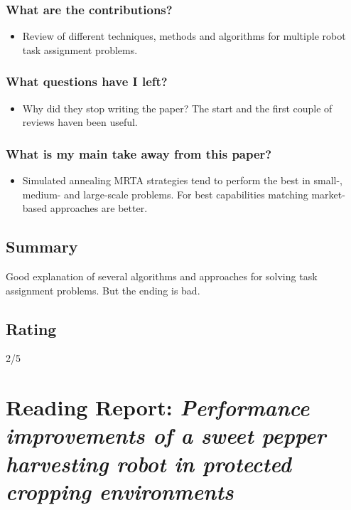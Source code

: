 \subsubsection*{What are the contributions?}
\begin{itemize}
    \item Review of different techniques, methods and algorithms for multiple robot task assignment problems.
\end{itemize}
\subsubsection*{What questions have I left?}
\begin{itemize}
    \item Why did they stop writing the paper? The start and the first couple of reviews haven been useful.
\end{itemize}
\subsubsection*{What is my main take away from this paper?}
\begin{itemize}
    \item Simulated annealing MRTA strategies tend to perform the best in small-, medium- and large-scale problems. For best capabilities matching market-based approaches are better.
\end{itemize}

\subsection*{Summary}
Good explanation of several algorithms and approaches for solving task assignment problems. But the ending is bad.
\subsection*{Rating}
2/5



\section{Reading Report: \emph{Performance improvements of a sweet pepper harvesting robot in protected cropping environments
}}
\cite{Lehnert2020}

